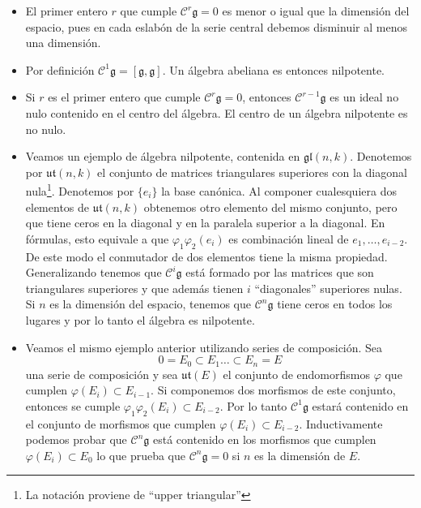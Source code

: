 \documentclass[a4paper,draft,12pt]{article}
\newcommand{\g}{\mathfrak{g}}%
\newcommand{\central}{\mathcal{C}}%
\begin{document}
\begin{itemize}

\item El primer entero $r$ que cumple $\central^r\g=0$ es menor o igual que la dimensión del espacio, pues en cada eslabón de la serie central debemos disminuir al menos  una dimensión.


\item Por definición $\central^1\g= [\g,\g]$.  Un álgebra abeliana es entonces nilpotente.



\item Si $r$ es el primer entero que cumple $\central^r\g=0$, entonces $\central^{r-1}\g$ es un ideal no nulo contenido en el centro del álgebra. El centro de un álgebra nilpotente es no nulo.



\item Veamos un ejemplo de álgebra nilpotente, contenida en $\mathfrak{gl}(n,k)$.  Denotemos por $\mathfrak{ut}(n,k)$ el conjunto de matrices triangulares superiores con la diagonal nula\footnote{La notación proviene de ``upper triangular''}.  Denotemos por $\{e_i\}$ la base canónica.  Al componer cualesquiera dos elementos de $\mathfrak{ut}(n,k)$ obtenemos otro elemento del mismo conjunto, pero que tiene ceros en la diagonal y en la paralela superior a la diagonal. 
  En fórmulas, esto equivale a que $\varphi_1\varphi_2(e_i)$ es combinación lineal de $e_1,\dots, e_{i-2}$. De este modo el conmutador de  dos elementos tiene  la misma propiedad.  Generalizando tenemos que $\central^i\g$ está formado por las matrices que son triangulares superiores y que además tienen $i$ ``diagonales'' superiores nulas.  Si $n$ es la dimensión del espacio, tenemos  que $\central^n\g$ tiene ceros en todos los lugares y por lo tanto el álgebra es nilpotente.
  
\item Veamos el mismo ejemplo anterior utilizando series de composición.  Sea 
$$
0=E_0\subset E_1 \dots \subset E_n=E
$$
una serie de composición y sea $\mathfrak{ut}(E)$ el conjunto de endomorfismos $\varphi$ que cumplen $\varphi(E_i)\subset E_{i-1}$.  Si componemos dos morfismos de este conjunto, entonces se cumple $\varphi_1 \varphi_2(E_i)\subset E_{i-2}$.  Por lo tanto $\central^1\g$ estará contenido en el conjunto de morfismos que cumplen $\varphi(E_i)\subset E_{i-2}$.  Inductivamente podemos probar que $\central^n\g$ está contenido en los morfismos que cumplen $\varphi(E_i) \subset E_0$ lo que  prueba que $\central^n\g=0$ si $n$ es la dimensión de $E$.

\end{itemize}
\end{document}
